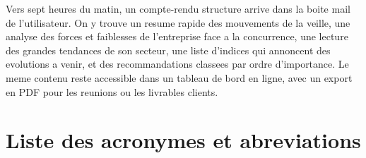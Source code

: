 \documentclass[12pt,a4paper,openany]{report}
\begin{document}
Vers sept heures du matin, un compte-rendu structure arrive dans la boite mail de l'utilisateur. On y trouve un resume rapide des mouvements de la veille, une analyse des forces et faiblesses de l'entreprise face a la concurrence, une lecture des grandes tendances de son secteur, une liste d'indices qui annoncent des evolutions a venir, et des recommandations classees par ordre d'importance. Le meme contenu reste accessible dans un tableau de bord en ligne, avec un export en PDF pour les reunions ou les livrables clients.

\tableofcontents
\listoffigures
\listoftables

\chapter*{Liste des acronymes et abreviations}
\end{document}
